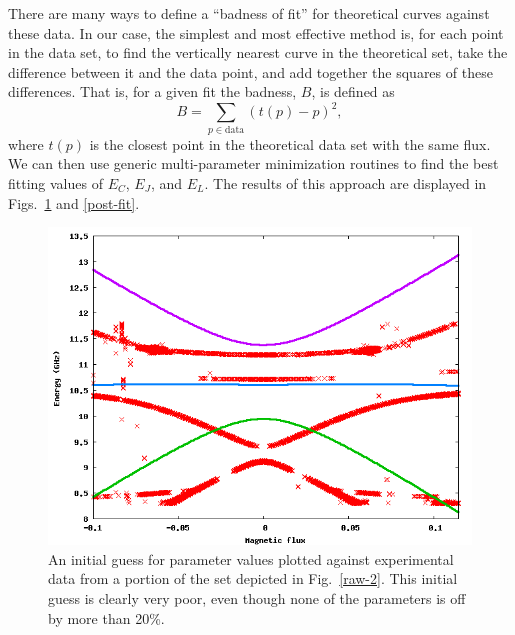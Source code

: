 \documentclass[twocolumn]{revtex4}
\begin{document}
There are many ways to define a ``badness of fit'' for theoretical
curves against these data. In our case, the simplest and most
effective method is, for each point in the data set, to find the
vertically nearest curve in the theoretical set, take the difference
between it and the data point, and add together the squares of these
differences. That is, for a given fit the badness, $B$, is defined as
\begin{equation}
\label{badness}
B = \sum_{p \in \text{data}} (t(p)-p)^2,
\end{equation}
where $t(p)$ is the closest point in the theoretical data set with the
same flux. We can then use generic multi-parameter minimization
routines to find the best fitting values of $E_C$, $E_J$, and
$E_L$\cite{Byrd}\cite{Zhu}. The results of this approach are displayed
in Figs.~\ref{pre-fit} and \ref{post-fit}.

\begin{figure}
\includegraphics[width=\linewidth]{CPBL-prefit.png}
\caption{ An initial guess for parameter values plotted against
  experimental data from a portion of the set depicted in
  Fig.~\ref{raw-2}. This initial guess is clearly very poor, even
  though none of the parameters is off by more than 20\%.}
\label{pre-fit}
\end{figure}
\end{document}
